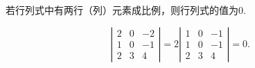 \begin{frame} 

%
\begin{tuilun}
  若行列式中有两行（列）元素成比例，则行列式的值为$0$.
\end{tuilun} \pause 
\begin{li}
  $$
  \left|
    \begin{array}{ccc}
      2 & 0 & -2\\
      1 & 0 & -1\\
      2 & 3 & 4
    \end{array}
  \right| =2 \left|
    \begin{array}{ccc}
      1 & 0 & -1\\
      1 & 0 & -1\\
      2 & 3 & 4
    \end{array}
  \right| = 0.
  $$
\end{li}
%
\end{frame}

